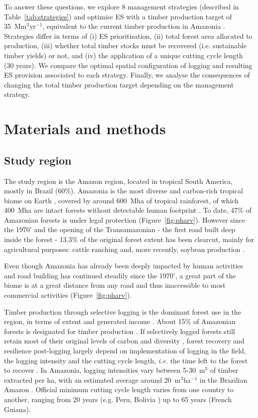 \documentclass{article}
\begin{document}
To answer these questions, we explore 8 management strategies (described in Table~\ref{tab:strategies}) and optimise ES with a timber production target of 35~Mm$^3$yr$^{-1}$, equivalent to the current timber production in Amazonia \cite{Lentini2005}. Strategies differ in terms of (i) ES prioritisation, (ii) total forest area allocated to production, (iii) whether total timber stocks must be recovered (i.e. sustainable timber yields) or not, and (iv) the application of a unique cutting cycle length (30 years). We compare the optimal spatial configuration of logging and resulting ES provision associated to each strategy. 
Finally, we analyse the consequences of changing the total timber production target depending on the management strategy.

\section{Materials and methods}

\subsection{Study region}

The study region is the Amazon region, located in tropical South America, mostly in Brazil (60\%). Amazonia is the most diverse and carbon-rich tropical biome on Earth \cite{Avitabile2016,Pimm2014}, covered by around 600~Mha of tropical rainforest, of which 400~Mha are intact forests without detectable human footprint \cite{Potapov2017}. To date, 47\% of Amazonian forests is under legal protection \cite{WDPA2016} (Figure~\ref{fig:pharv}). However since the 1970' and the opening of the Transamazonian - the first road built deep inside the forest - 13.3\% of the original forest extent has been clearcut, mainly for agricultural purposes: cattle ranching and, more recently, soybean production \cite{Fearnside2017}. 

Even though Amazonia has already been deeply impacted by human activities and road building has continued steadily since the 1970', a great part of the biome is at a great distance from any road and thus inaccessible to most commercial activities (Figure~\ref{fig:pharv}).

Timber production through selective logging is the dominant forest use in the region, in terms of extent and generated income \cite{Blaser2011}. About 15\% of Amazonian forests is designated for timber production \cite{FAO2011}. If selectively logged forests still retain most of their original levels of carbon and diversity \cite{Putz2012}, forest recovery and resilience post-logging largely depend on implementation of logging in the field, the logging intensity and the cutting cycle length, \textit{i.e.} the time left to the forest to recover \cite{Rutishauser2015,Piponiot2018}. In Amazonia, logging intensities vary between 5-30~m$^3$ of timber extracted per ha, with an estimated average around 20~m$^3$ha$^{-1}$ in the Brazilian Amazon \cite{Asner2005}. Official minimum cutting cycle length varies from one country to another, ranging from 20 years (e.g. Peru, Bolivia \cite{Fredericksen2003,Blaser2011}) up to 65 years (French Guiana). 
\end{document}
